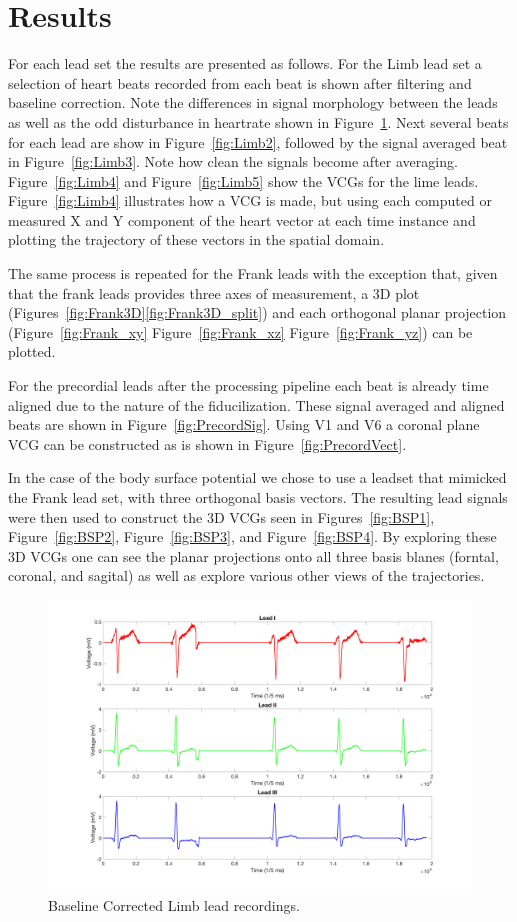 \documentclass[12pt]{article}
\begin{document}
\section{Results}
\par{}
For each lead set the results are presented as follows. For the Limb lead set a selection of heart beats recorded from each beat is shown after filtering and baseline correction. Note the differences in signal morphology between the leads as well as the odd disturbance in heartrate shown in Figure~\ref{fig:Limb1}. Next several beats for each lead are show in Figure~\ref{fig:Limb2}, followed by the signal averaged beat in Figure~\ref{fig:Limb3}. Note how clean the signals become after averaging. Figure~\ref{fig:Limb4} and Figure~\ref{fig:Limb5} show the VCGs for the lime leads. Figure~\ref{fig:Limb4} illustrates how a VCG is made, but using each computed or measured X and Y component of the heart vector at each time instance and plotting the trajectory of these vectors in the spatial domain. 
\par{}
The same process is repeated for the Frank leads with the exception that, given that the frank leads provides three axes of measurement, a 3D plot (Figures~\ref{fig:Frank3D}\ref{fig:Frank3D_split}) and each orthogonal planar projection (Figure~\ref{fig:Frank_xy} Figure~\ref{fig:Frank_xz} Figure~\ref{fig:Frank_yz}) can be plotted.
\par{}
For the precordial leads after the processing pipeline each beat is already time aligned due to the nature of the fiducilization. These signal averaged and aligned beats are shown in Figure~\ref{fig:PrecordSig}. Using V1 and V6 a coronal plane VCG can be constructed as is shown in Figure~\ref{fig:PrecordVect}.
\par{}
In the case of the body surface potential we chose to use a leadset that mimicked the Frank lead set, with three orthogonal basis vectors. The resulting lead signals were then used to construct the 3D VCGs seen in Figures~\ref{fig:BSP1}, Figure~\ref{fig:BSP2}, Figure~\ref{fig:BSP3}, and Figure~\ref{fig:BSP4}. By exploring these 3D VCGs one can see the planar projections onto all three basis blanes (forntal, coronal, and sagital) as well as explore various other views of the trajectories.

\begin{figure}[H]
	
	\centering
	\includegraphics[width = .8\textwidth]{Figures/LimLeads1.png}
	\caption{Baseline Corrected Limb lead recordings.}
	\label{fig:Limb1}
\end{figure}
\end{document}
